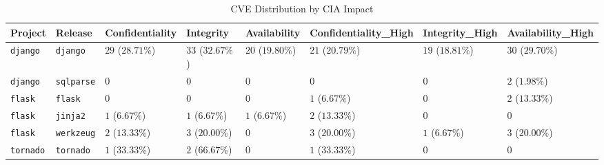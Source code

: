 \begin{table}
\caption{CVE Distribution by CIA Impact}
\label{tab:cve-cia-distribution}
\begin{tabular}{llllllll}
\toprule
Project & Release & Confidentiality & Integrity & Availability & Confidentiality_High & Integrity_High & Availability_High \\
\midrule
\texttt{django} & \texttt{django} & $29$ ($28.71\%$) & $33$ ($32.67\%$) & $20$ ($19.80\%$) & $21$ ($20.79\%$) & $19$ ($18.81\%$) & $30$ ($29.70\%$) \\
\texttt{django} & \texttt{sqlparse} & $0$ & $0$ & $0$ & $0$ & $0$ & $2$ ($1.98\%$) \\
\texttt{flask} & \texttt{flask} & $0$ & $0$ & $0$ & $1$ ($6.67\%$) & $0$ & $2$ ($13.33\%$) \\
\texttt{flask} & \texttt{jinja2} & $1$ ($6.67\%$) & $1$ ($6.67\%$) & $1$ ($6.67\%$) & $2$ ($13.33\%$) & $0$ & $0$ \\
\texttt{flask} & \texttt{werkzeug} & $2$ ($13.33\%$) & $3$ ($20.00\%$) & $0$ & $3$ ($20.00\%$) & $1$ ($6.67\%$) & $3$ ($20.00\%$) \\
\texttt{tornado} & \texttt{tornado} & $1$ ($33.33\%$) & $2$ ($66.67\%$) & $0$ & $1$ ($33.33\%$) & $0$ & $0$ \\
\bottomrule
\end{tabular}
\end{table}

